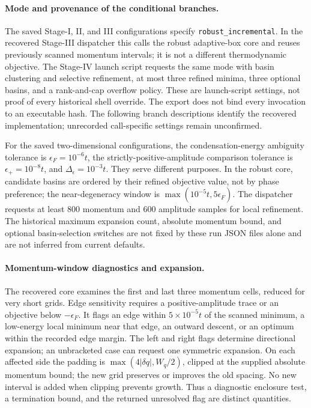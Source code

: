 \paragraph{Mode and provenance of the conditional branches.}
The saved Stage-I, II, and III configurations specify \texttt{robust\_incremental}. In the recovered Stage-III dispatcher this calls the robust adaptive-box core and reuses previously scanned momentum intervals; it is not a different thermodynamic objective. The Stage-IV launch script requests the same mode with basin clustering and selective refinement, at most three refined minima, three optional basins, and a rank-and-cap overflow policy. These are launch-script settings, not proof of every historical shell override. The export does not bind every invocation to an executable hash. The following branch descriptions identify the recovered implementation; unrecorded call-specific settings remain unconfirmed.

For the saved two-dimensional configurations, the condensation-energy ambiguity tolerance is $\epsilon_F=10^{-6}t$, the strictly-positive-amplitude comparison tolerance is $\epsilon_+=10^{-8}t$, and $\Delta_\epsilon=10^{-3}t$. They serve different purposes. In the robust core, candidate basins are ordered by their refined objective value, not by phase preference; the near-degeneracy window is $\max(10^{-5}t,5\epsilon_F)$. The dispatcher requests at least 800 momentum and 600 amplitude samples for local refinement. The historical maximum expansion count, absolute momentum bound, and optional basin-selection switches are not fixed by these run JSON files alone and are not inferred from current defaults.

\paragraph{Momentum-window diagnostics and expansion.}
The recovered core examines the first and last three momentum cells, reduced for very short grids. Edge sensitivity requires a positive-amplitude trace or an objective below $-\epsilon_F$. It flags an edge within $5\times10^{-5}t$ of the scanned minimum, a low-energy local minimum near that edge, an outward descent, or an optimum within the recorded edge margin. The left and right flags determine directional expansion; an unbracketed case can request one symmetric expansion. On each affected side the padding is $\max(4|\delta q|,W_q/2)$, clipped at the supplied absolute momentum bound; the new grid preserves or improves the old spacing. No new interval is added when clipping prevents growth. Thus a diagnostic enclosure test, a termination bound, and the returned unresolved flag are distinct quantities.

